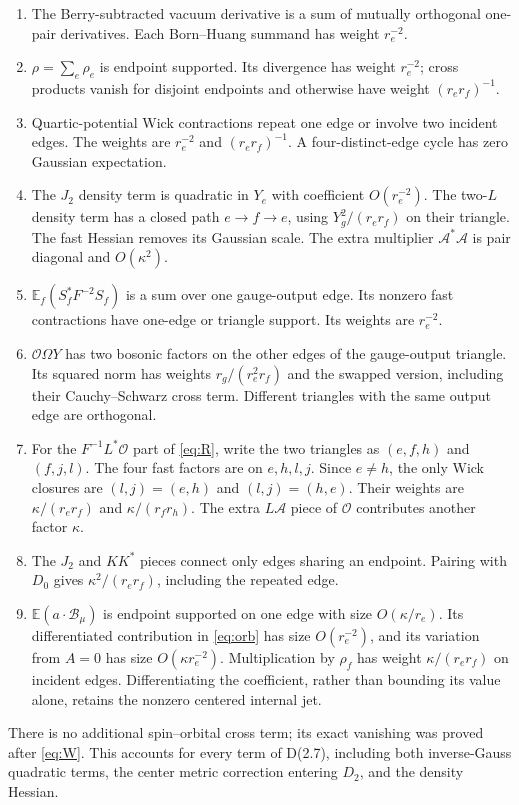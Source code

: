\documentclass[11pt,letterpaper]{article}
\newcommand{\E}{\mathbb E}
\newcommand{\calA}{\mathcal A}
\newcommand{\calO}{\mathcal O}
\newcommand{\calB}{\mathcal B}
\begin{document}
\begin{enumerate}
\item The Berry-subtracted vacuum derivative is a sum of mutually orthogonal one-pair derivatives. Each Born--Huang summand has weight $r_e^{-2}$.
\item $\rho=\sum_e\rho_e$ is endpoint supported. Its divergence has weight $r_e^{-2}$; cross products vanish for disjoint endpoints and otherwise have weight $(r_er_f)^{-1}$.
\item Quartic-potential Wick contractions repeat one edge or involve two incident edges. The weights are $r_e^{-2}$ and $(r_er_f)^{-1}$. A four-distinct-edge cycle has zero Gaussian expectation.
\item The $J_2$ density term is quadratic in $Y_e$ with coefficient $O(r_e^{-2})$. The two-$L$ density term has a closed path $e\to f\to e$, using $Y_g^2/(r_er_f)$ on their triangle. The fast Hessian removes its Gaussian scale. The extra multiplier $\calA^*\calA$ is pair diagonal and $O(\kappa^2)$.
\item $\E_f(S_f^*F^{-2}S_f)$ is a sum over one gauge-output edge. Its nonzero fast contractions have one-edge or triangle support. Its weights are $r_e^{-2}$.
\item $\calO\Omega Y$ has two bosonic factors on the other edges of the gauge-output triangle. Its squared norm has weights $r_g/(r_e^2r_f)$ and the swapped version, including their Cauchy--Schwarz cross term. Different triangles with the same output edge are orthogonal.
\item For the $F^{-1}L^*\calO$ part of \eqref{eq:R}, write the two triangles as $(e,f,h)$ and $(f,j,l)$. The four fast factors are on $e,h,l,j$. Since $e\ne h$, the only Wick closures are $(l,j)=(e,h)$ and $(l,j)=(h,e)$. Their weights are $\kappa/(r_er_f)$ and $\kappa/(r_fr_h)$. The extra $L\calA$ piece of $\calO$ contributes another factor $\kappa$.
\item The $J_2$ and $KK^*$ pieces connect only edges sharing an endpoint. Pairing with $D_0$ gives $\kappa^2/(r_er_f)$, including the repeated edge.
\item $\E(a\cdot\calB_\mu)$ is endpoint supported on one edge with size $O(\kappa/r_e)$. Its differentiated contribution in \eqref{eq:orb} has size $O(r_e^{-2})$, and its variation from $A=0$ has size $O(\kappa r_e^{-2})$. Multiplication by $\rho_f$ has weight $\kappa/(r_er_f)$ on incident edges. Differentiating the coefficient, rather than bounding its value alone, retains the nonzero centered internal jet.
\end{enumerate}
There is no additional spin--orbital cross term; its exact vanishing was proved after \eqref{eq:W}. This accounts for every term of D(2.7), including both inverse-Gauss quadratic terms, the center metric correction entering $D_2$, and the density Hessian.
\end{document}

